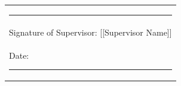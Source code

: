 \documentclass[conference]{IEEEtran}
\begin{document}
\vspace{4mm}
\noindent\begin{tabular}{@{}l@{}}
\rule{4.5cm}{0.4pt}\\
Signature of Supervisor: [[Supervisor Name]]\\
Date: \rule{2.5cm}{0.4pt}
\end{tabular}
\end{document}
